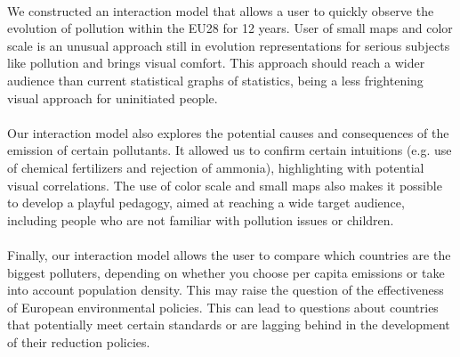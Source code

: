 \documentclass[preprint,journal]{vgtc}       %
\begin{document}
\paragraph{}
We constructed an interaction model that allows a user to quickly observe the evolution of pollution within the EU28 for 12 years. User of small maps and color scale is an unusual approach still in evolution representations for serious subjects like pollution and brings visual comfort. This approach should reach a wider audience than current statistical graphs of statistics, being a less frightening visual approach for uninitiated people.

\paragraph{}
Our interaction model also explores the potential causes and consequences of the emission of certain pollutants. It allowed us to confirm certain intuitions (e.g. use of chemical fertilizers and rejection of ammonia), highlighting with potential visual correlations. The use of color scale and small maps also makes it possible to develop a playful pedagogy, aimed at reaching a wide target audience, including people who are not familiar with pollution issues or children. 

\paragraph{}
Finally, our interaction model allows the user to compare which countries are the biggest polluters, depending on whether you choose per capita emissions or take into account population density. This may raise the question of the effectiveness of European environmental policies. This can lead to questions about countries that potentially meet certain standards or are lagging behind in the development of their reduction policies.


%

%
%
%

\end{document}
